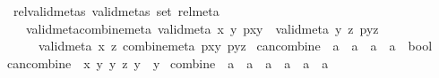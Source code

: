 \begin{isabellebody}
\ \ \ rel{\isacharunderscore}{\kern0pt}valid{\isacharunderscore}{\kern0pt}metas{\isacharcolon}{\kern0pt}\ {\isachardoublequoteopen}valid{\isacharunderscore}{\kern0pt}metas\ {\isacharparenleft}{\kern0pt}set\ rel{\isacharunderscore}{\kern0pt}meta{\isacharparenright}{\kern0pt}{\isachardoublequoteclose}\isanewline
\ \ \ \ \ valid{\isacharunderscore}{\kern0pt}meta{\isacharunderscore}{\kern0pt}combine{\isacharunderscore}{\kern0pt}meta{\isacharcolon}{\kern0pt}\ {\isachardoublequoteopen}valid{\isacharunderscore}{\kern0pt}meta\ {\isacharparenleft}{\kern0pt}x{\isacharcomma}{\kern0pt}\ y{\isacharparenright}{\kern0pt}\ pxy\ {\isasymLongrightarrow}\ valid{\isacharunderscore}{\kern0pt}meta\ {\isacharparenleft}{\kern0pt}y{\isacharcomma}{\kern0pt}\ z{\isacharparenright}{\kern0pt}\ pyz\isanewline
\ \ \ \ \ \ {\isasymLongrightarrow}\ valid{\isacharunderscore}{\kern0pt}meta\ {\isacharparenleft}{\kern0pt}x{\isacharcomma}{\kern0pt}\ z{\isacharparenright}{\kern0pt}\ {\isacharparenleft}{\kern0pt}combine{\isacharunderscore}{\kern0pt}meta\ pxy\ pyz{\isacharparenright}{\kern0pt}{\isachardoublequoteclose}\isanewline
{}\isanewline
\isanewline
{}\isamarkupfalse%
\ can{\isacharunderscore}{\kern0pt}combine\ {\isacharcolon}{\kern0pt}{\isacharcolon}{\kern0pt}\ {\isachardoublequoteopen}{\isacharparenleft}{\kern0pt}{\isacharprime}{\kern0pt}a\ {\isacharasterisk}{\kern0pt}\ {\isacharprime}{\kern0pt}a{\isacharparenright}{\kern0pt}\ {\isasymRightarrow}\ {\isacharparenleft}{\kern0pt}{\isacharprime}{\kern0pt}a\ {\isacharasterisk}{\kern0pt}\ {\isacharprime}{\kern0pt}a{\isacharparenright}{\kern0pt}\ {\isasymRightarrow}\ bool{\isachardoublequoteclose}\ \isanewline
\ \ {\isachardoublequoteopen}can{\isacharunderscore}{\kern0pt}combine\ {\isacharequal}{\kern0pt}\ {\isacharparenleft}{\kern0pt}{\isasymlambda}{\isacharparenleft}{\kern0pt}x{\isacharcomma}{\kern0pt}\ y{\isacharparenright}{\kern0pt}\ {\isacharparenleft}{\kern0pt}y{\isacharprime}{\kern0pt}{\isacharcomma}{\kern0pt}\ z{\isacharparenright}{\kern0pt}{\isachardot}{\kern0pt}\ y\ {\isacharequal}{\kern0pt}\ y{\isacharprime}{\kern0pt}{\isacharparenright}{\kern0pt}{\isachardoublequoteclose}\isanewline
\isanewline
{}\isamarkupfalse%
\ combine\ {\isacharcolon}{\kern0pt}{\isacharcolon}{\kern0pt}\ {\isachardoublequoteopen}{\isacharparenleft}{\kern0pt}{\isacharprime}{\kern0pt}a\ {\isacharasterisk}{\kern0pt}\ {\isacharprime}{\kern0pt}a{\isacharparenright}{\kern0pt}\ {\isasymRightarrow}\ {\isacharparenleft}{\kern0pt}{\isacharprime}{\kern0pt}a\ {\isacharasterisk}{\kern0pt}\ {\isacharprime}{\kern0pt}a{\isacharparenright}{\kern0pt}\ {\isasymRightarrow}\ {\isacharparenleft}{\kern0pt}{\isacharprime}{\kern0pt}a\ {\isacharasterisk}{\kern0pt}\ {\isacharprime}{\kern0pt}a{\isacharparenright}{\kern0pt}{\isachardoublequoteclose}\ \ \isanewline

\end{isabellebody}
